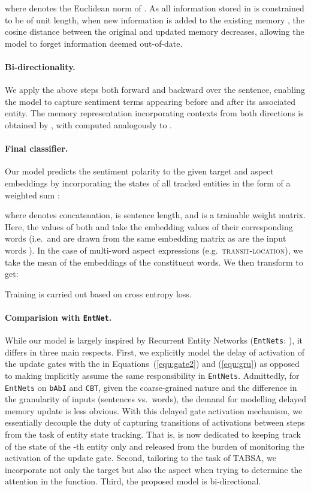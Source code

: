 \documentclass[11pt,a4paper]{article}
\newcommand{\eg}{e.g.\ }
\newcommand{\ie}{i.e.\ }
\newcommand{\aspect}[1]{\textsc{#1}\xspace}
\newcommand{\system}[2][]{\texttt{#2#1}\xspace}
\newcommand{\equref}[2][]{Equation#1~\bracketref{#2}}
\newcommand{\bracketref}[1]{(\ref{#1})\xspace}
\newcommand{\ent}[1][]{\system[#1]{EntNet}}
\newcommand{\babi}{\system{bAbI}}
\newcommand{\cbt}{\system{CBT}}
\begin{document}
where  denotes the Euclidean norm of . 
As all information stored in  is constrained to be of unit length, when new information  is added to the existing memory , the cosine distance between the original and updated memory decreases, allowing the model to forget information deemed out-of-date.

\paragraph{Bi-directionality.} We apply the above steps both forward and backward over the sentence, enabling the model to capture sentiment terms appearing before and after its associated entity. The memory representation incorporating contexts from both directions is obtained by , with  computed analogously to .

\paragraph{Final classifier.} Our model predicts the sentiment polarity  to the given target  and aspect  embeddings by incorporating the states of all tracked entities in the form of a weighted sum :

where  denotes concatenation,  is sentence length, and  is a trainable weight matrix.
Here, the values of both  and  take the embedding values of their corresponding words (\ie  and  are drawn from the same embedding matrix as are the input words ).
In the case of multi-word aspect expressions (\eg \aspect{transit-location}), we take the mean of the embeddings of the constituent words.
We then transform  to get:

Training is carried out based on cross entropy loss.


\paragraph{Comparision with \ent.} While our model is largely inspired by Recurrent Entity Networks (\ent[s]: ), it differs in three main respects. 
First, we explicitly model the delay of activation of the update gates  with the  in \equref[s]{equ:gate2} and (\ref{equ:gru}) as opposed to making  implicitly assume the same responsibility in \ent[s]. Admittedly, for \ent[s] on \babi and \cbt, given the coarse-grained nature and the difference in the granularity of inputs (sentences vs.\ words), the demand for modelling delayed memory update is less obvious. With this delayed gate activation mechanism, we essentially decouple the duty of capturing transitions of activations between steps from the task of entity state tracking. That is,  is now dedicated to keeping track of the state of the -th entity only and released from the burden of monitoring the activation of the update gate. 
Second, tailoring to the task of TABSA, we incorporate not only the target  but also the aspect  when trying to determine the attention in the  function. Third, the proposed model is bi-directional.
\end{document}
